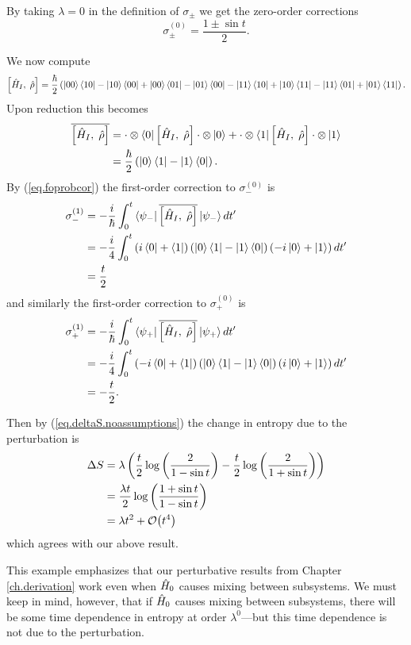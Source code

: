 By taking \(\lambda=0\) in the definition of \(\sigma_\pm\) we get the zero-order corrections
\[
\sigma_\pm^{(0)} = \frac{1\pm \sin t}{2}.
\]

We now compute
\[
\left[\hat{H}_I, \;\hat{\rho}\right] = \frac{\hbar}{2} \left(\left|00\right\rangle\left\langle10\right|- \left|10\right\rangle\left\langle00\right| + \left|00\right\rangle\left\langle01\right| - \left|01\right\rangle\left\langle00\right| - \left|11\right\rangle\left\langle10\right| + \left|10\right\rangle\left\langle11\right| - \left|11\right\rangle\left\langle01\right| +\left|01\right\rangle\left\langle11\right|\right).
\]
Upon reduction this becomes
\begin{align*}
\overline{\left[\hat{H}_I, \;\hat{\rho}\right]} &= \cdot\otimes\left\langle0\right| \left[\hat{H}_I, \;\hat{\rho}\right] \cdot\otimes\left|0\right\rangle + \cdot\otimes\left\langle1\right| \left[\hat{H}_I, \;\hat{\rho}\right] \cdot\otimes\left|1\right\rangle \\
&= \frac{\hbar}{2}\left(\left|0\right\rangle\left\langle1\right| - \left|1\right\rangle\left\langle0\right|\right).
\end{align*}
By (\ref{eq.foprobcor}) the first-order correction to \(\sigma_-^{(0)}\) is
\begin{align*}
\sigma_-^{(1)} &= -\frac{i}{\hbar} \int_{0}^t \left\langle\psi_-\right| \overline{\left[\hat{H}_I, \;\hat{\rho}\right]} \left|\psi_-\right\rangle dt^\prime \\
&= -\frac{i}{4} \int_{0}^t \left(i\left\langle0\right| + \left\langle1\right|\right) \left(\left|0\right\rangle\left\langle1\right| - \left|1\right\rangle\left\langle0\right|\right) \left(-i\left|0\right\rangle + \left|1\right\rangle\right) dt^\prime \\
&= \frac{t}{2}
\end{align*}
and similarly the first-order correction to \(\sigma_+^{(0)}\) is
\begin{align*}
\sigma_+^{(1)} &= -\frac{i}{\hbar} \int_{0}^t \left\langle\psi_+\right| \overline{\left[\hat{H}_I, \;\hat{\rho}\right]} \left|\psi_+\right\rangle dt^\prime \\
&= -\frac{i}{4} \int_{0}^t \left(-i\left\langle0\right| + \left\langle1\right|\right) \left(\left|0\right\rangle\left\langle1\right| - \left|1\right\rangle\left\langle0\right|\right) \left(i\left|0\right\rangle + \left|1\right\rangle\right) dt^\prime \\
&= -\frac{t}{2}.
\end{align*}

Then by (\ref{eq.deltaS.noassumptions}) the change in entropy due to the perturbation is
\begin{align*}
\Delta S &= \lambda \left(\frac{t}{2} \log \left(\frac{2}{1 - \sin t}\right) - \frac{t}{2}\log\left(\frac{2}{1+\sin t}\right)\right) \\
&= \frac{\lambda t}{2} \log \left(\frac{1+ \sin t}{1 - \sin t}\right) \\
&= \lambda t^2 + \mathcal{O}{\left(t^4\right)}
\end{align*}
which agrees with our above result.

This example emphasizes that our perturbative results from Chapter \ref{ch.derivation} work even when \(\hat{H}_0\) causes mixing between subsystems. We must keep in mind, however, that if \(\hat{H}_0\) causes mixing between subsystems, there will be some time dependence in entropy at order \(\lambda^0\)---but this time dependence is not due to the perturbation.

